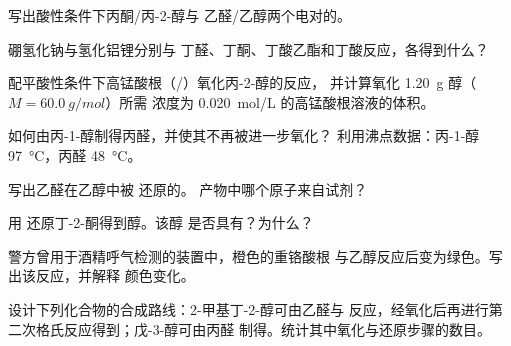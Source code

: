 \begin{exercise}[$\star$]\label{exo:b1:organic-redox:3}
写出酸性条件下丙酮/丙-2-醇与
乙醛/乙醇两个电对的。
\end{exercise}

\begin{exercise}[$\star$]\label{exo:b1:organic-redox:4}
硼氢化钠与氢化铝锂分别与
丁醛、丁酮、丁酸乙酯和丁酸反应，各得到什么？
\end{exercise}

\begin{exercise}[$\star\star$]\label{exo:b1:organic-redox:5}
配平酸性条件下高锰酸根（/）氧化丙-2-醇的反应，
并计算氧化 \qty{1.20}{g} 醇（$M = \qty{60.0}{g/mol}$）所需
浓度为 \qty{0.020}{mol/L} 的高锰酸根溶液的体积。
\end{exercise}

\begin{exercise}[$\star\star$]\label{exo:b1:organic-redox:6}
如何由丙-1-醇制得丙醛，并使其不再被进一步氧化？
利用沸点数据：丙-1-醇 \qty{97}{\celsius}，丙醛
\qty{48}{\celsius}。
\end{exercise}

\begin{exercise}[$\star\star$]\label{exo:b1:organic-redox:7}
写出乙醛在乙醇中被  还原的。
产物中哪个原子来自试剂？
\end{exercise}

\begin{exercise}[$\star\star$]\label{exo:b1:organic-redox:8}
用  还原丁-2-酮得到醇。该醇
是否具有？为什么？
\end{exercise}

\begin{exercise}[$\star\star$]\label{exo:b1:organic-redox:9}
警方曾用于酒精呼气检测的装置中，橙色的重铬酸根
与乙醇反应后变为绿色。写出该反应，并解释
颜色变化。
\end{exercise}

\begin{exercise}[$\star\star\star$]\label{exo:b1:organic-redox:10}
设计下列化合物的合成路线：2-甲基丁-2-醇可由乙醛与
反应，经氧化后再进行第二次格氏反应得到；戊-3-醇可由丙醛
制得。统计其中氧化与还原步骤的数目。
\end{exercise}

